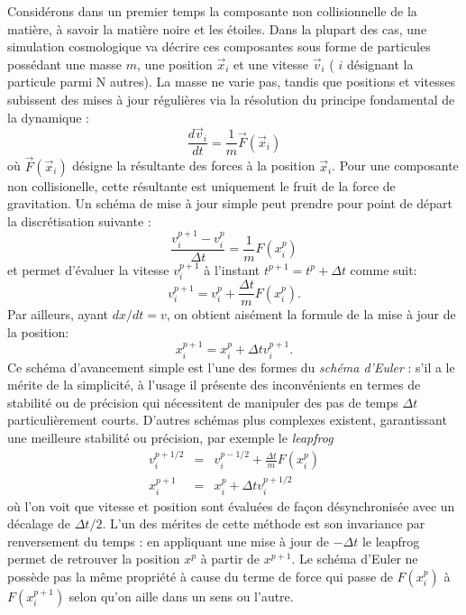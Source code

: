 Considérons dans un premier temps la composante non collisionnelle de la matière, à savoir la matière noire et les étoiles. Dans la plupart des cas, une simulation cosmologique va décrire ces composantes sous forme de particules possédant une masse $m$, une position $\vec x_i$ et une vitesse $\vec v_i$ ( $i$ désignant la particule parmi N autres). La masse ne varie pas, tandis que positions et vitesses subissent des mises à jour régulières via la résolution du principe fondamental de la dynamique :
\begin{equation}
\frac{d \vec v_i}{dt}=\frac{1}{m} \vec{F}(\vec x_i)
\end{equation}
où $\vec{F}(\vec x_i)$ désigne la résultante des forces à la position $\vec x_i$. Pour une composante non collisionelle, cette résultante est uniquement le fruit de la force de gravitation. Un schéma de mise à jour simple peut prendre pour point de départ la discrétisation suivante :
\begin{equation}
\frac{v_i^{p+1}-v_i^{p}}{\Delta t}=\frac{1}{m} {F}(x_i^p)
\end{equation}
et permet d'évaluer la vitesse $v_i^{p+1}$ à l'instant $t^{p+1}=t^p+\Delta t$ comme suit:
\begin{equation}
v_i^{p+1}=v_i^{p}+\frac{\Delta t}{m} {F}(x_i^p).
\end{equation}
Par ailleurs, ayant $dx/dt=v$, on obtient aisément la formule de la mise à jour de la position:
\begin{equation}
x^{p+1}_i=x^{p}_i+\Delta t v_i^{p+1}.
\end{equation}
Ce schéma d'avancement simple est l'une des formes du \textit{schéma d'Euler} : s'il a le mérite de la simplicité, à l'usage il présente des inconvénients en termes de stabilité ou de précision qui nécessitent de manipuler des pas de temps $\Delta t$ particulièrement courts. D'autres schémas plus complexes existent, garantissant une meilleure stabilité ou précision, par exemple le \textit{leapfrog}
\begin{eqnarray}
v_i^{p+1/2}&=&v_i^{p-1/2}+\frac{\Delta t}{m} {F}(x_i^p)\\
x^{p+1}_i&=&x^{p}_i+\Delta t v_i^{p+1/2}
\end{eqnarray}
où l'on voit que vitesse et position sont évaluées de façon désynchronisée avec un décalage de $\Delta t/2$. L'un des mérites de cette méthode est son invariance par renversement du temps  : en appliquant une mise à jour de $-\Delta t$ le leapfrog permet de retrouver la position $x^p$ à partir de $x^{p+1}$. Le schéma d'Euler ne possède pas la même propriété à cause du terme de force qui passe de ${F}(x_i^p)$ à  ${F}(x_i^{p+1})$ selon qu'on aille dans un sens ou l'autre. 

